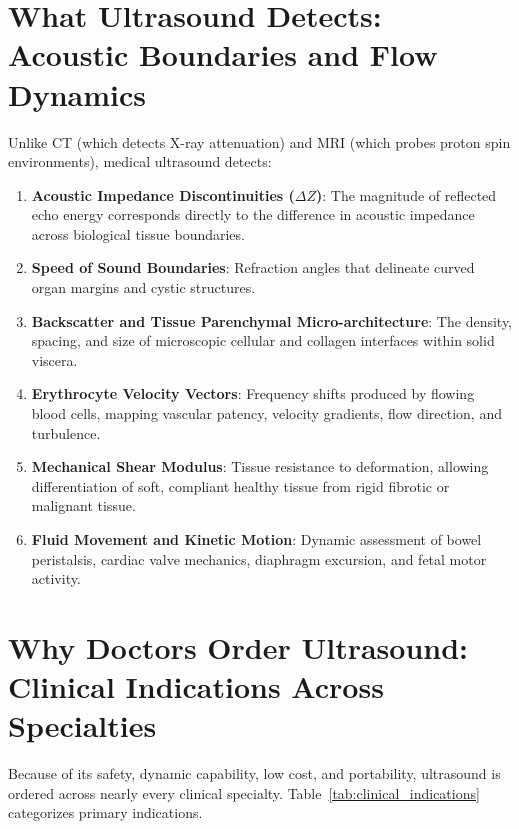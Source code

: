 \documentclass[11pt,a4paper]{article}
\begin{document}
\section{What Ultrasound Detects: Acoustic Boundaries and Flow Dynamics}

Unlike CT (which detects X-ray attenuation) and MRI (which probes proton spin environments), medical ultrasound detects:
\begin{enumerate}[leftmargin=*]
    \item \textbf{Acoustic Impedance Discontinuities ($\Delta Z$)}: The magnitude of reflected echo energy corresponds directly to the difference in acoustic impedance across biological tissue boundaries.
    \item \textbf{Speed of Sound Boundaries}: Refraction angles that delineate curved organ margins and cystic structures.
    \item \textbf{Backscatter and Tissue Parenchymal Micro-architecture}: The density, spacing, and size of microscopic cellular and collagen interfaces within solid viscera.
    \item \textbf{Erythrocyte Velocity Vectors}: Frequency shifts produced by flowing blood cells, mapping vascular patency, velocity gradients, flow direction, and turbulence.
    \item \textbf{Mechanical Shear Modulus}: Tissue resistance to deformation, allowing differentiation of soft, compliant healthy tissue from rigid fibrotic or malignant tissue.
    \item \textbf{Fluid Movement and Kinetic Motion}: Dynamic assessment of bowel peristalsis, cardiac valve mechanics, diaphragm excursion, and fetal motor activity.
\end{enumerate}

\section{Why Doctors Order Ultrasound: Clinical Indications Across Specialties}

Because of its safety, dynamic capability, low cost, and portability, ultrasound is ordered across nearly every clinical specialty. Table~\ref{tab:clinical_indications} categorizes primary indications.
\end{document}

